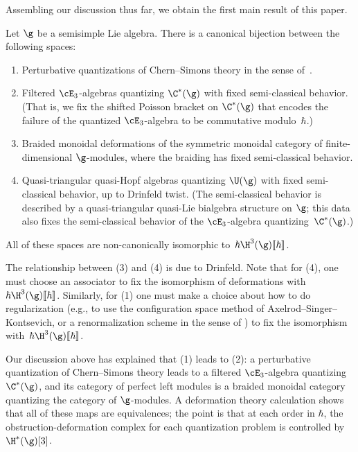 \documentclass[10pt]{amsart}
\begin{document}
Assembling our discussion thus far, we obtain the first main result of this paper.

\begin{thm}
\label{first main theorem}
Let $\g$ be a semisimple Lie algebra.
There is a canonical bijection between the following spaces:
\begin{enumerate} 
 \item Perturbative quantizations of Chern--Simons theory in the sense of~\cite{CosBook}. 
 \item Filtered $\cE_3$-algebras quantizing $\C^*(\g)$ with fixed semi-classical behavior. 
 (That is, we fix the shifted Poisson bracket on $\C^*(\g)$ that encodes the failure of the quantized $\cE_3$-algebra to be commutative modulo~$\hbar$.) 
 \item Braided monoidal deformations of the symmetric monoidal category of finite-dimensional $\g$-modules, where the braiding has fixed semi-classical behavior. 
 \item Quasi-triangular quasi-Hopf algebras quantizing $\U(\g)$ with fixed semi-classical behavior, up to Drinfeld twist. (The semi-classical behavior is described by a quasi-triangular quasi-Lie bialgebra structure on $\g$; this data also fixes the semi-classical behavior of the $\cE_3$-algebra quantizing~$\C^*(\g)$.) 
\end{enumerate}
All of these spaces are non-canonically isomorphic to~$\hbar \H^3(\g)[\![\hbar]\!]$. 
\end{thm} 

The relationship between (3) and (4) is due to Drinfeld.
Note that for (4), one must choose an associator to fix the isomorphism of deformations with $\hbar \H^3(\g)[\![\hbar]\!]$. 
Similarly, for (1) one must make a choice about how to do regularization (e.g., to use the configuration space method of Axelrod--Singer--Kontsevich, or a renormalization scheme in the sense of \cite{CosBook}) to fix the isomorphism with~$\hbar \H^3(\g)[\![\hbar]\!]$.

Our discussion above has explained that (1) leads to (2): 
a perturbative quantization of Chern--Simons theory leads to a filtered $\cE_3$-algebra quantizing $\C^*(\g)$, and its category of perfect left modules is a braided monoidal category quantizing the category of $\g$-modules.  
A deformation theory calculation shows that all of these maps are equivalences; 
the point is that at each order in $\hbar$, the obstruction-deformation complex for each quantization problem is controlled by~$\H^\ast(\g)[3]$.   
\end{document}
